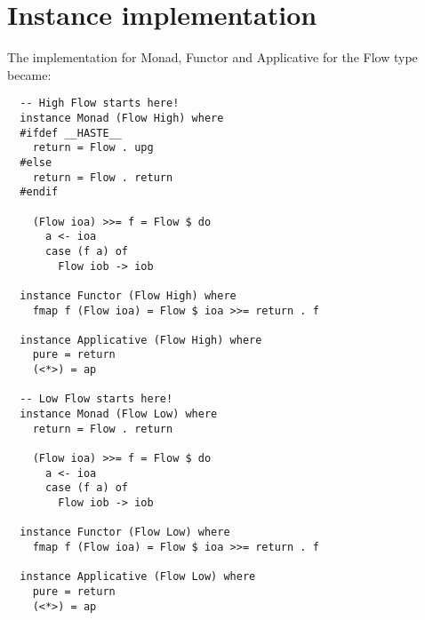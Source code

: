 \chapter{Instance implementation}
\label{app:instances}
The implementation for Monad, Functor and Applicative for the Flow type became:
\begin{verbatim}
  -- High Flow starts here!
  instance Monad (Flow High) where
  #ifdef __HASTE__
    return = Flow . upg
  #else
    return = Flow . return
  #endif

    (Flow ioa) >>= f = Flow $ do
      a <- ioa
      case (f a) of
        Flow iob -> iob

  instance Functor (Flow High) where
    fmap f (Flow ioa) = Flow $ ioa >>= return . f

  instance Applicative (Flow High) where
    pure = return
    (<*>) = ap

  -- Low Flow starts here!
  instance Monad (Flow Low) where
    return = Flow . return

    (Flow ioa) >>= f = Flow $ do
      a <- ioa
      case (f a) of
        Flow iob -> iob

  instance Functor (Flow Low) where
    fmap f (Flow ioa) = Flow $ ioa >>= return . f

  instance Applicative (Flow Low) where
    pure = return
    (<*>) = ap
\end{verbatim}
